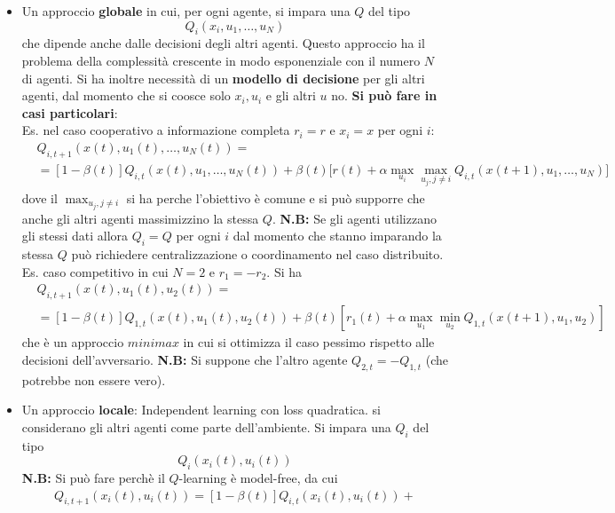 \begin{itemize}
\item Un approccio \textbf{globale} in cui, per ogni agente, si impara una $Q$ del tipo
    \begin{equation}
    Q_i(x_i, u_1, \dots, u_N)
    \end{equation} che dipende anche dalle decisioni degli altri agenti. Questo approccio ha il problema della complessit\`a crescente in modo esponenziale con il numero $N$ di agenti. Si ha inoltre necessit\`a di un \textbf{modello di decisione} per gli altri agenti, dal momento che si coosce solo $x_i, u_i$ e gli altri $u$ no. \textbf{Si pu\`o fare in casi particolari}:\\
    Es. nel caso cooperativo a informazione completa $r_i = r$ e $x_i = x$ per ogni $i$:
    \begin{align*}
    &Q_{i,t+1}(x(t), u_1(t), \dots, u_N(t)) = \\
    &=[1 - \beta(t)] Q_{i,t}(x(t), u_1, \dots, u_N(t)) + \beta(t) \Big [ r(t) + \alpha \max_{u_i} \max_{u_j, j\neq i} Q_{i,t}(x(t+1),u_1, \dots, u_N) \Big ]
    \end{align*} dove il $\max_{u_j, j\neq i}$ si ha perche l'obiettivo \`e comune e si pu\`o supporre che anche gli altri agenti massimizzino la stessa $Q$. \textbf{N.B:} Se gli agenti utilizzano gli stessi dati allora $Q_i=Q$ per ogni $i$ dal momento che stanno imparando la stessa $Q$ pu\`o richiedere centralizzazione o coordinamento nel caso distribuito.
    Es. caso competitivo in cui $N=2$ e $r_1 = -r_2$. Si ha
    \begin{align*}
    &Q_{i,t+1}(x(t), u_1(t), u_2(t)) = \\
    &=[1-\beta(t)]Q_{1,t}(x(t),u_1(t),u_2(t)) + \beta(t)[r_1(t) + \alpha \max_{u_1} \min_{u_2} Q_{1,t}(x(t+1),u_1, u_2)]
    \end{align*} che \`e un approccio $minimax$ in cui si ottimizza il caso pessimo rispetto alle decisioni dell'avversario. \textbf{N.B:} Si suppone che l'altro agente $Q_{2,t} = - Q_{1,t}$ (che potrebbe non essere vero).
\item Un approccio \textbf{locale}: Independent learning con loss quadratica. si considerano gli altri agenti come parte dell'ambiente. Si impara una $Q_i$ del tipo
    \begin{equation}
    Q_i(x_i(t), u_i(t))
    \end{equation} \textbf{N.B:} Si pu\`o fare perch\`e il $Q$-learning \`e model-free, da cui
    \begin{align}
    Q_{i,t+1}(x_i(t),u_i(t)) = [1-\beta(t)] Q_{i,t} (x_i(t),u_i(t)) + \\

\end{align}
\end{itemize}

